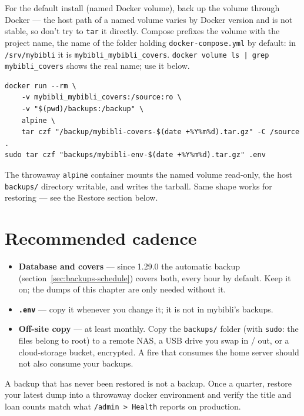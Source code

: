For the default install (named Docker volume), back up the volume
through Docker — the host path of a named volume varies by Docker
version and is not stable, so don't try to \texttt{tar} it directly.
Compose prefixes the volume with the project name, the name of the
folder holding \texttt{docker-compose.yml} by default: in
\texttt{/srv/mybibli} it is \texttt{mybibli\_mybibli\_covers}.
\texttt{docker volume ls | grep mybibli\_covers} shows the real name; use
it below.

\begin{lstlisting}
docker run --rm \
    -v mybibli_mybibli_covers:/source:ro \
    -v "$(pwd)/backups:/backup" \
    alpine \
    tar czf "/backup/mybibli-covers-$(date +%Y%m%d).tar.gz" -C /source .
sudo tar czf "backups/mybibli-env-$(date +%Y%m%d).tar.gz" .env
\end{lstlisting}

The throwaway \texttt{alpine} container mounts the named volume
read-only, the host \texttt{backups/} directory writable, and writes
the tarball. Same shape works for restoring — see the Restore
section below.

\section{Recommended cadence}

\begin{itemize}
  \item \textbf{Database and covers} — since 1.29.0 the automatic
        backup (section~\ref{sec:backups-schedule}) covers both, every
        hour by default. Keep it on; the dumps of this chapter are only
        needed without it.
  \item \textbf{\texttt{.env}} — copy it whenever you change it; it is
        not in mybibli's backups.
  \item \textbf{Off-site copy} — at least monthly. Copy the
        \texttt{backups/} folder (with \texttt{sudo}: the files belong
        to root) to a remote NAS, a USB drive you swap in / out, or a
        cloud-storage bucket, encrypted. A fire that consumes the home
        server should not also consume your backups.
\end{itemize}

\begin{tip}
A backup that has never been restored is not a backup. Once a
quarter, restore your latest dump into a throwaway docker
environment and verify the title and loan counts match what
\texttt{/admin > Health} reports on production.
\end{tip}

